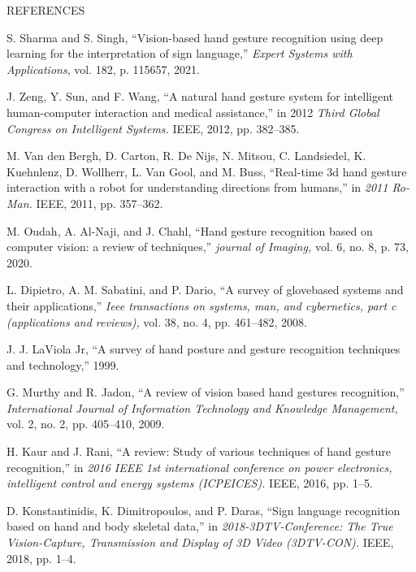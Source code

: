 \documentclass[twocolumn]{article}
\begin{document}
\begin{center}
    REFERENCES
\end{center}
\begin{itemize}
 \footnotesize{
  \renewcommand{\labelitemi}{[1]}
  \item  S. Sharma and S. Singh, “Vision-based hand gesture recognition using deep learning for the interpretation of sign language,”
  \textit {Expert Systems with Applications}, vol. 182, p. 115657, 2021. 
 \renewcommand{\labelitemi}{[2]}
  \item J. Zeng, Y. Sun, and F. Wang, “A natural hand gesture system for intelligent human-computer interaction and medical assistance,” in 2012 \textit{Third Global Congress on Intelligent Systems.} IEEE, 2012, pp. 382–385. 
  \renewcommand{\labelitemi}{[3]}
  \item M. Van den Bergh, D. Carton, R. De Nijs, N. Mitsou, C. Landsiedel, K. Kuehnlenz, D. Wollherr, L. Van Gool, and M. Buss, “Real-time 3d hand gesture interaction with a robot for understanding directions from humans,” in \textit{2011 Ro-Man.} IEEE, 2011, pp. 357–362. 
  \renewcommand{\labelitemi}{[4]}
  \item M. Oudah, A. Al-Naji, and J. Chahl, “Hand gesture recognition based on computer vision: a review of techniques,”\textit{ journal of Imaging,} vol. 6, no. 8, p. 73, 2020. 
  \renewcommand{\labelitemi}{[5]}
  \item L. Dipietro, A. M. Sabatini, and P. Dario, “A survey of glovebased systems and their applications,” \textit{Ieee transactions on systems, man, and cybernetics, part c (applications and reviews),} vol. 38, no. 4, pp. 461–482, 2008. 
  \renewcommand{\labelitemi}{[6]}
  \item J. J. LaViola Jr, “A survey of hand posture and gesture recognition techniques and technology,” 1999. 
  \renewcommand{\labelitemi}{[7]}
  \item G. Murthy and R. Jadon, “A review of vision based hand gestures recognition,” \textit {International Journal of Information Technology and Knowledge Management,} vol. 2, no. 2, pp. 405–410, 2009. 
  \renewcommand{\labelitemi}{[8]}
  \item H. Kaur and J. Rani, “A review: Study of various techniques of hand gesture recognition,” in \textit{2016 IEEE 1st international conference on power electronics, intelligent control and energy systems (ICPEICES).} IEEE, 2016, pp. 1–5. 
  \renewcommand{\labelitemi}{[9]}
  \item D. Konstantinidis, K. Dimitropoulos, and P. Daras, “Sign language recognition based on hand and body skeletal data,” in \textit{2018-3DTV-Conference: The True Vision-Capture, Transmission and Display of 3D Video (3DTV-CON).} IEEE, 2018, pp. 1–4. 
}
\end{itemize}
\end{document}
